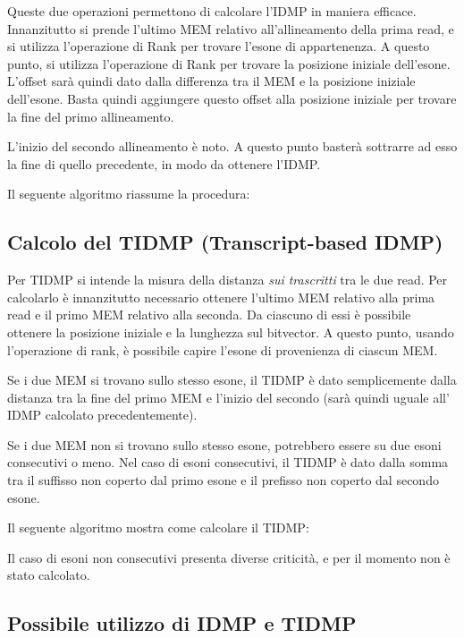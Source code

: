 Queste due operazioni permettono di calcolare l'IDMP in maniera efficace. Innanzitutto si prende l'ultimo MEM relativo all'allineamento della prima read, e si utilizza l'operazione di Rank per trovare l'esone di appartenenza. A questo punto, si utilizza l'operazione di Rank per trovare la posizione iniziale dell'esone. L'offset sarà quindi dato dalla differenza tra il MEM e la posizione iniziale dell'esone. Basta quindi aggiungere questo offset alla posizione iniziale per trovare la fine del primo allineamento.

L'inizio del secondo allineamento è noto. A questo punto basterà sottrarre ad esso la fine di quello precedente, in modo da ottenere l'IDMP.

Il seguente algoritmo riassume la procedura:

\newpage

\subsection{Calcolo del TIDMP (Transcript-based IDMP)}
Per TIDMP si intende la misura della distanza \textit{sui trascritti} tra le due read. Per calcolarlo è innanzitutto necessario ottenere l'ultimo MEM relativo alla prima read e il primo MEM relativo alla seconda. Da ciascuno di essi è possibile ottenere la posizione iniziale e la lunghezza sul bitvector. A questo punto, usando l'operazione di rank, è possibile capire l'esone di provenienza di ciascun MEM.

Se i due MEM si trovano sullo stesso esone, il TIDMP è dato semplicemente dalla distanza tra la fine del primo MEM e l'inizio del secondo (sarà quindi uguale all' IDMP calcolato precedentemente).

Se i due MEM non si trovano sullo stesso esone, potrebbero essere su due esoni consecutivi o meno. Nel caso di esoni consecutivi, il TIDMP è dato dalla somma tra il suffisso non coperto dal primo esone e il prefisso non coperto dal secondo esone.

Il seguente algoritmo mostra come calcolare il TIDMP:



Il caso di esoni non consecutivi presenta diverse criticità, e per il momento non è stato calcolato.

\newpage

\subsection{Possibile utilizzo di IDMP e TIDMP}

\newpage